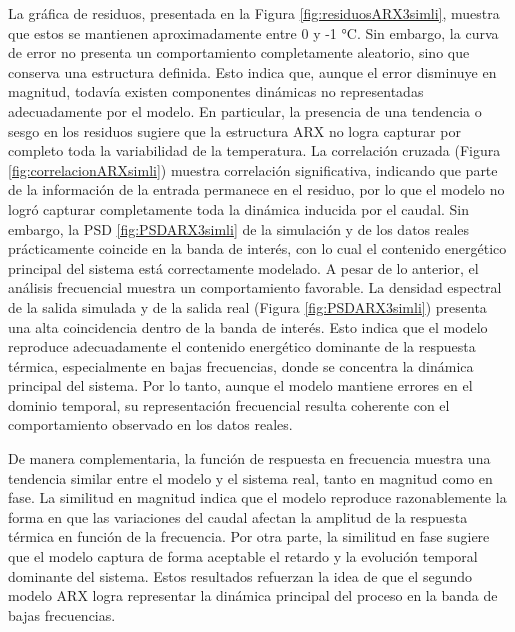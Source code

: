 \documentclass[11pt]{report}
\begin{document}
La gráfica de residuos, presentada en la Figura \ref{fig:residuosARX3simli}, muestra que estos se mantienen aproximadamente entre 0 y -1 °C. Sin embargo, la curva de error no presenta un comportamiento completamente aleatorio, sino que conserva una estructura definida. Esto indica que, aunque el error disminuye en magnitud, todavía existen componentes dinámicas no representadas adecuadamente por el modelo. En particular, la presencia de una tendencia o sesgo en los residuos sugiere que la estructura ARX no logra capturar por completo toda la variabilidad de la temperatura.
La correlación cruzada (Figura \ref{fig:correlacionARXsimli}) muestra correlación significativa, indicando que  parte de la información de la entrada permanece en el residuo, por lo que el modelo no logró capturar completamente toda la dinámica inducida por el caudal. Sin embargo, la PSD \ref{fig:PSDARX3simli} de la simulación y de los datos reales prácticamente coincide en la banda de interés, con lo cual el contenido energético principal del sistema está correctamente modelado.
A pesar de lo anterior, el análisis frecuencial muestra un comportamiento favorable. La densidad espectral de la salida simulada y de la salida real (Figura \ref{fig:PSDARX3simli}) presenta una alta coincidencia dentro de la banda de interés. Esto indica que el modelo reproduce adecuadamente el contenido energético dominante de la respuesta térmica, especialmente en bajas frecuencias, donde se concentra la dinámica principal del sistema. Por lo tanto, aunque el modelo mantiene errores en el dominio temporal, su representación frecuencial resulta coherente con el comportamiento observado en los datos reales.

De manera complementaria, la función de respuesta en frecuencia muestra una tendencia similar entre el modelo y el sistema real, tanto en magnitud como en fase. La similitud en magnitud indica que el modelo reproduce razonablemente la forma en que las variaciones del caudal afectan la amplitud de la respuesta térmica en función de la frecuencia. Por otra parte, la similitud en fase sugiere que el modelo captura de forma aceptable el retardo y la evolución temporal dominante del sistema. Estos resultados refuerzan la idea de que el segundo modelo ARX logra representar la dinámica principal del proceso en la banda de bajas frecuencias.
\end{document}
